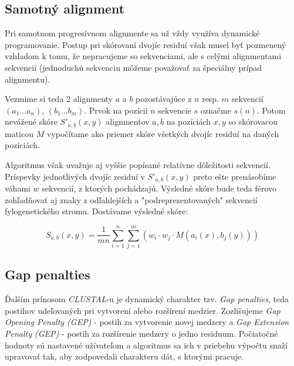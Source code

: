 \documentclass[nobib]{tufte-handout}
\begin{document}
\subsection{Samotný alignment}\label{sec:alignment}

Pri samotnom progresívnom alignmente sa už vždy využíva dynamické programovanie. Postup pri skórovaní dvojíc residuí však musel byť pozmenený vzhľadom k tomu, že nepracujeme so sekvenciami, ale s celými alignmentami sekvencií (jednoduchú sekvenciu môžeme považovať za špeciálny prípad alignmentu).

Vezmime si teda 2 alignmenty $a$ a $b$ pozostávajúce z $n$ resp. $m$ sekvencií $(a_1 \hdots a_n)$, $(b_1 \hdots b_m)$. Prvok na pozícii $n$ sekvencie $s$ označme $s(n)$. Potom nevážené skóre $S'_{a,b}(x,y)$ alignmentov $a,b$ na pozíciách $x,y$ so skórovacou maticou $M$ vypočítame ako priemer skóre všetkých dvojíc residuí na daných pozíciách.



Algoritmus však uvažuje aj vyššie popísané relatívne dôležitosti sekvencií. Príspevky jednotlivých dvojíc residuí v $S'_{a,b}(x,y)$ preto ešte prenásobíme váhami $w$ sekvencií, z ktorých pochádzajú. Výsledné skóre bude teda férovo zohľadňovať aj znaky z odľahlejších a "podreprezentovaných" sekvencií fylogenetického stromu. Dostávame výsledné skóre:


$$
S_{a,b}(x,y) = \frac{1}{mn} \sum_{i = 1}^{n} \sum_{j = 1}^{m} (w_i\cdot w_j \cdot M(a_i(x), b_j(y)))
$$


\subsection{Gap penalties}\label{sec:gaps}

Ďalším prínosom \emph{CLUSTAL}-u je dynamický charakter tzv. \emph{Gap penalties}, teda postihov udeľovaných pri vytvorení alebo rozšírení medzier. Zozlišujeme \emph{Gap Opening Penalty (GEP)} - postih za vytvorenie novej medzery a \emph{Gap Extension Penalty (GEP)} - postih za rozšírenie medzery o jedno residuum. Počiatočné hodnoty sú nastavené užívateľom a  algoritmus sa ich v priebehu výpočtu snaží upravovať tak, aby zodpovedali charakteru dát, s ktorými pracuje.
\end{document}
